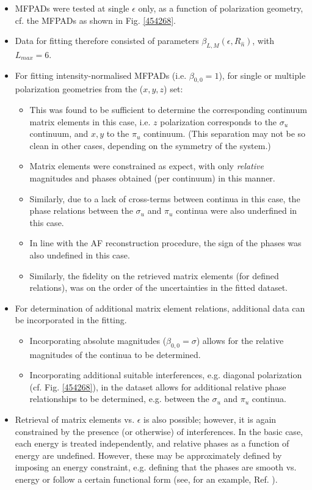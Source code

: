\documentclass[10pt]{article}
\begin{document}
\begin{itemize}
\item MFPADs were tested at single $\epsilon$ only, as a function of polarization geometry, cf. the MFPADs as shown in Fig. \ref{454268}.
\item Data for fitting therefore consisted of parameters $\beta_{L,M}(\epsilon,R_{\hat{n}})$, with $L_{max}=6$.
\item For fitting intensity-normalised MFPADs (i.e. $\beta_{0,0}=1$), for single or multiple polarization geometries from the ($x,y,z$) set:
\begin{itemize}
\item This was found to be sufficient to determine the corresponding continuum matrix elements in this case, i.e. $z$ polarization corresponds to the $\sigma_u$ continuum, and $x,y$ to the $\pi_u$ continuum. (This separation may not be so clean in other cases, depending on the symmetry of the system.)
\item Matrix elements were constrained as expect, with only \textit{relative} magnitudes and phases obtained (per continuum) in this manner.
\item Similarly, due to a lack of cross-terms between continua in this case, the phase relations between the $\sigma_u$ and $\pi_u$ continua were also underfined in this case.
\item In line with the AF reconstruction procedure, the sign of the phases was also undefined in this case.
\item Similarly, the fidelity on the retrieved matrix elements (for defined relations), was on the order of the uncertainties in the fitted dataset.
\end{itemize}
\item For determination of additional matrix element relations, additional data can be incorporated in the fitting.
\begin{itemize}
\item Incorporating absolute magnitudes ($\beta_{0,0}=\sigma$) allows for the relative magnitudes of the continua to be determined.
\item Incorporating additional suitable interferences, e.g. diagonal polarization (cf. Fig. \ref{454268}), in the dataset allows for additional relative phase relationships to be determined, e.g. between the $\sigma_u$ and $\pi_u$ continua.
\end{itemize}
\item Retrieval of matrix elements vs. $\epsilon$ is also possible; however, it is again constrained by the presence (or otherwise) of interferences. In the basic case, each energy is treated independently, and relative phases as a function of energy are undefined. However, these may be approximately defined by imposing an energy constraint, e.g. defining that the phases are smooth vs. energy or follow a certain functional form (see, for an example, Ref. \cite{Yagishita2005}). %
\end{itemize}
\end{document}
